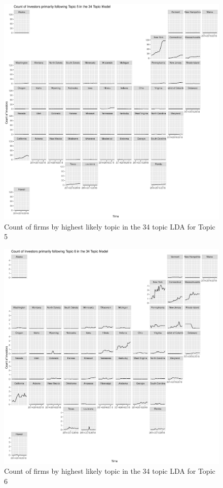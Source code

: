 		\begin{figure}
		\centering
		\includegraphics[width=1\linewidth]{Figures/ChapterV/USA_34_Topic05.pdf}
		\caption[Count of firm for Topic 5 by quarter]{Count of firms by highest likely topic in the 34 topic LDA for Topic 5}
		\label{fig:StateLDA5}
	\end{figure}
	
		\begin{figure}
		\centering
		\includegraphics[width=1\linewidth]{Figures/ChapterV/USA_34_Topic06.pdf}
		\caption[Count of firm for Topic 6 by quarter]{Count of firms by highest likely topic in the 34 topic LDA for Topic 6}
		\label{fig:StateLDA6}
	\end{figure}
	
